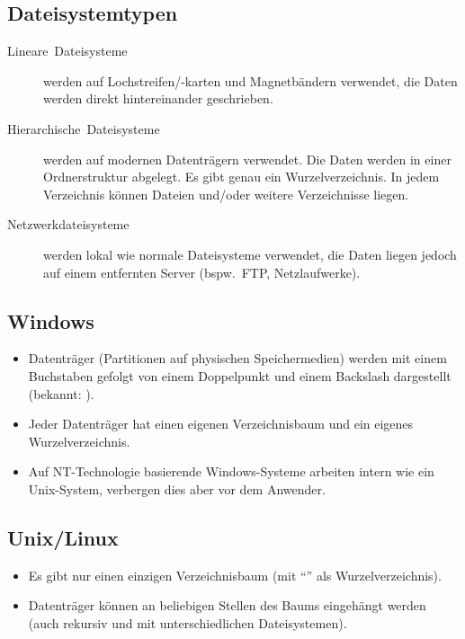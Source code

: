 \subsection{Dateisystemtypen}
\begin{description}
  \item [{Lineare~Dateisysteme}] 
	werden auf Lochstreifen/-karten und Magnetbändern verwendet, die Daten werden direkt hintereinander geschrieben.
  \item [{Hierarchische~Dateisysteme}] 
	werden auf modernen Datenträgern verwendet.
	Die Daten werden in einer Ordnerstruktur abgelegt.
	Es gibt genau ein Wurzelverzeichnis.
	In jedem Verzeichnis können Dateien und/oder weitere Verzeichnisse liegen.
  \item [{Netzwerkdateisysteme}] 
	werden lokal wie normale Dateisysteme verwendet, die Daten liegen jedoch auf einem entfernten Server (bspw.~FTP, Netzlaufwerke).
\end{description}

\subsection{Windows}
\begin{itemize}
  \item {}
	Datenträger (Partitionen auf physischen Speichermedien) werden mit einem Buchstaben gefolgt von einem Doppelpunkt und einem Backslash dargestellt (bekannt: ).
  \item Jeder Datenträger hat einen eigenen Verzeichnisbaum und ein eigenes Wurzelverzeichnis.
  \item Auf NT-Technologie basierende Windows-Systeme arbeiten intern wie ein Unix-System, verbergen dies aber vor dem Anwender.
\end{itemize}

\subsection{Unix/Linux}
\begin{itemize}
  \item {}
	Es gibt nur einen einzigen Verzeichnisbaum (mit \enquote{\code{/}} als Wurzelverzeichnis).
  \item Datenträger können an beliebigen Stellen des Baums eingehängt werden (auch rekursiv und mit unterschiedlichen Dateisystemen).
\end{itemize}

